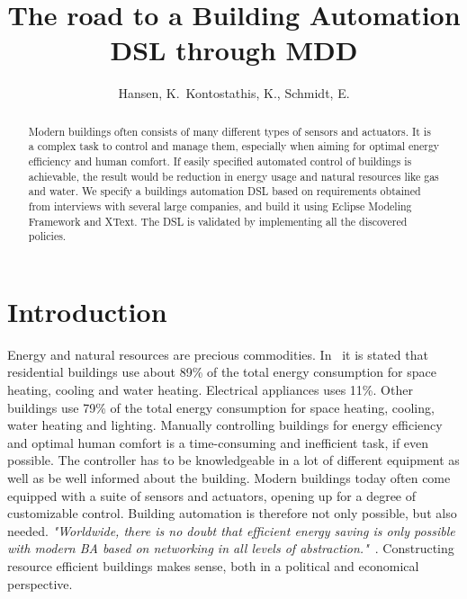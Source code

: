 \documentclass{llncs}
\begin{document}
\frontmatter
\pagestyle{headings}
\title{The road to a Building Automation DSL through MDD}
\author{Hansen, K.\, Kontostathis, K., Schmidt, E.}
\maketitle

\begin{abstract}
Modern buildings often consists of many different types of sensors and actuators. It is a complex task to control and manage them, especially when aiming for optimal energy efficiency and human comfort. If easily specified automated control of buildings is achievable, the result would be reduction in energy usage and natural resources like gas and water. We specify a buildings automation DSL based on requirements obtained from interviews with several large companies, and build it using Eclipse Modeling Framework and XText. The DSL is validated by implementing all the discovered policies.
\end{abstract}

\section{Introduction}
Energy and natural resources are precious commodities. In~\cite{janssen2004towards} it is stated that residential buildings use about 89\% of the total energy consumption for space heating, cooling and water heating. Electrical appliances uses 11\%. Other buildings use 79\% of the total energy consumption for space heating, cooling, water heating and lighting. Manually controlling buildings for energy efficiency and optimal human comfort is a time-consuming and inefficient task, if even possible. The controller has to be knowledgeable in a lot of different equipment as well as be well informed about the building. Modern buildings today often come equipped with a suite of sensors and actuators, opening up for a degree of customizable control. Building automation is therefore not only possible, but also needed. \textit{"Worldwide, there is no doubt that efficient energy saving is only possible with modern BA based on networking in all levels of abstraction."}~\cite{dietrich2010communication}. Constructing resource efficient buildings makes sense, both in a political and economical perspective. 
\end{document}
